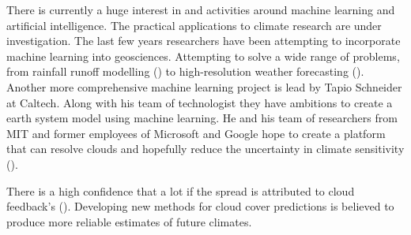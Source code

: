 There is currently a huge interest in and activities around machine learning and artificial intelligence.
The practical applications to climate research are under investigation. The last few years researchers have been attempting to incorporate machine learning into geosciences. Attempting to solve a wide range of problems, from rainfall runoff modelling (\cite{hess-23-5089-2019}) to  high-resolution weather forecasting (\cite{Rodrigues2018DeepDownscale:Forecast}).
Another more comprehensive machine learning project is lead by Tapio Schneider at Caltech. Along with his team of technologist they have ambitions to create a earth system model using machine learning. He and his team of researchers from MIT and former employees of Microsoft and Google hope to create a platform that can resolve clouds and hopefully reduce the uncertainty in climate sensitivity (\cite{Voosen2018ScienceIntelligence}).

There is a high confidence that a lot if the spread is attributed to cloud feedback's (\cite{IPCC_CH9_climate_models}). Developing new methods for cloud cover predictions is believed to produce more reliable estimates of future climates.




